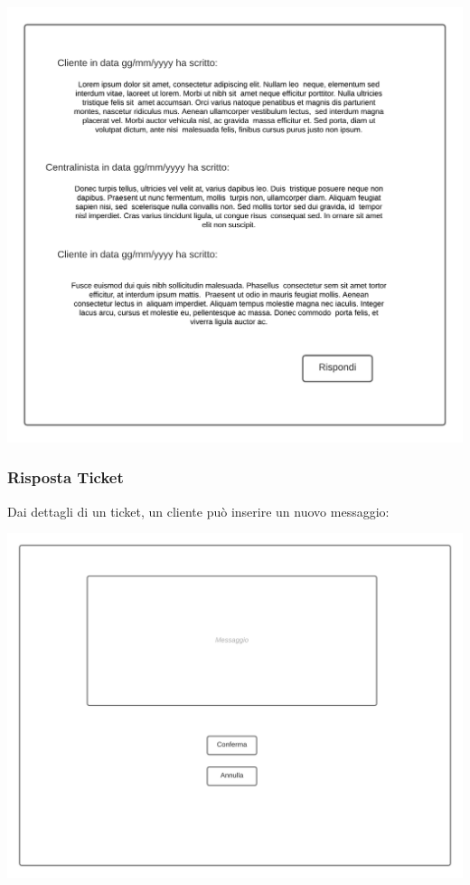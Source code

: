 \documentclass[12pt]{article}
\begin{document}
\begin{center}
\includegraphics[height=0.3\textheight]{Mockup/Cliente/DettagliTicket}
\end{center}

\subsubsection{Risposta Ticket}
Dai dettagli di un ticket, un cliente può inserire un nuovo messaggio:

\begin{center}
\includegraphics[height=0.3\textheight]{Mockup/Cliente/RispostaTicket}
\end{center}
\end{document}
